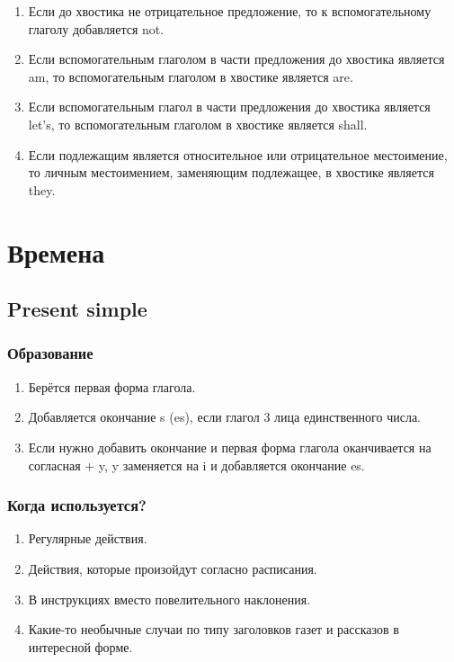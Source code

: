 \documentclass[oneside]{book}
\begin{document}
    \begin{enumerate}
        \item Если до хвостика не отрицательное предложение, то
        к вспомогательному глаголу добавляется not.

        \item Если вспомогательным глаголом в части предложения
        до хвостика является am, то вспомогательным глаголом
        в хвостике является are.

        \item Если вспомогательным глагол в части предложения до
        хвостика является let's, то вспомогательным глаголом в
        хвостике является shall.

        \item Если подлежащим является относительное или отрицательное местоимение,
        то личным местоимением, заменяющим подлежащее, в хвостике является they.
    \end{enumerate}

    \chapter{Времена}
    \section{Present simple}
    \subsection{Образование}
    \begin{enumerate}
        \item Берётся первая форма глагола.

        \item Добавляется окончание s (es), если глагол 3 лица единственного числа.

        \item Если нужно добавить окончание и первая форма глагола
        оканчивается на согласная + y, y заменяется на i и
        добавляется окончание es.
    \end{enumerate}

    \subsection{Когда используется?}
    \begin{enumerate}
        \item Регулярные действия.
        \item Действия, которые произойдут согласно расписания.
        \item В инструкциях вместо повелительного наклонения.
        \item Какие-то необычные случаи по типу заголовков газет и
        рассказов в интересной форме.
    \end{enumerate}
\end{document}
